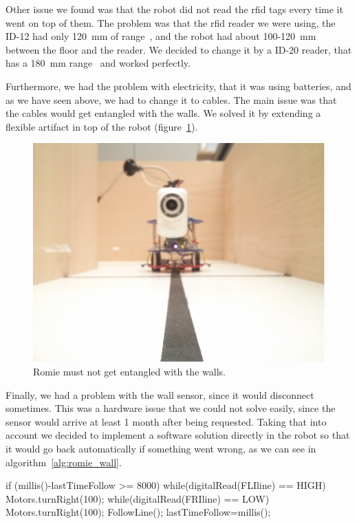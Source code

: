 Other issue we found was that the robot did not read the \acrshort{rfid} tags every time it went on
top of them. The problem was that the \acrshort{rfid} reader we were using, the ID-12 had only
120~mm of range~\cite{rfid}, and the robot had about 100-120~mm between the floor and the reader.
We decided to change it by a ID-20 reader, that has a 180~mm range~\cite{rfid} and worked perfectly.

Furthermore, we had the problem with electricity, that it was using batteries, and as we have seen
above, we had to change it to cables. The main issue was that the cables would get entangled with
the walls. We solved it by extending a flexible artifact in top of the robot
(figure~\ref{fig:lines}).

\begin{figure}[!htbp]
	\centering
	\includegraphics[height=0.35\textheight]{fig/lines}
	\caption{Romie must not get entangled with the walls.}
	\label{fig:lines}
\end{figure}

Finally, we had a problem with the wall sensor, since it would disconnect sometimes. This was a
hardware issue that we could not solve easily, since the sensor would arrive at least 1 month after
being requested. Taking that into account we decided to implement a software solution directly in
the robot so that it would go back automatically if something went wrong, as we can see in
algorithm~\ref{alg:romie_wall}.

\begin{center}
\begin{minipage}{.9\textwidth}
\singlespace
\begin{pyglist}[language=c, caption={Arduino code for returning if wall was hit.},
	label={alg:romie_wall}, listingname={Algorithm}, numbers=left]
if (millis()-lastTimeFollow >= 8000) {
	while(digitalRead(FLIline) == HIGH) Motors.turnRight(100);
	while(digitalRead(FRIline) == LOW) Motors.turnRight(100);
	FollowLine();
	lastTimeFollow=millis();
}
\end{pyglist}
\end{minipage}
\end{center}
